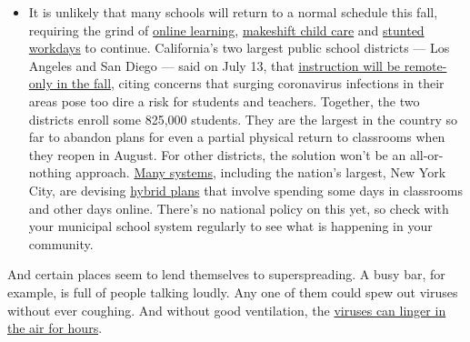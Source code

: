 \begin{itemize}
  \begin{itemize}
  \tightlist
  \item
    It is unlikely that many schools will return to a normal schedule
    this fall, requiring the grind of
    \href{https://www.nytimes3xbfgragh.onion/2020/06/05/us/coronavirus-education-lost-learning.html?action=click\&pgtype=Article\&state=default\&region=MAIN_CONTENT_3\&context=storylines_faq}{online
    learning},
    \href{https://www.nytimes3xbfgragh.onion/2020/05/29/us/coronavirus-child-care-centers.html?action=click\&pgtype=Article\&state=default\&region=MAIN_CONTENT_3\&context=storylines_faq}{makeshift
    child care} and
    \href{https://www.nytimes3xbfgragh.onion/2020/06/03/business/economy/coronavirus-working-women.html?action=click\&pgtype=Article\&state=default\&region=MAIN_CONTENT_3\&context=storylines_faq}{stunted
    workdays} to continue. California's two largest public school
    districts --- Los Angeles and San Diego --- said on July 13, that
    \href{https://www.nytimes3xbfgragh.onion/2020/07/13/us/lausd-san-diego-school-reopening.html?action=click\&pgtype=Article\&state=default\&region=MAIN_CONTENT_3\&context=storylines_faq}{instruction
    will be remote-only in the fall}, citing concerns that surging
    coronavirus infections in their areas pose too dire a risk for
    students and teachers. Together, the two districts enroll some
    825,000 students. They are the largest in the country so far to
    abandon plans for even a partial physical return to classrooms when
    they reopen in August. For other districts, the solution won't be an
    all-or-nothing approach.
    \href{https://bioethics.jhu.edu/research-and-outreach/projects/eschool-initiative/school-policy-tracker/}{Many
    systems}, including the nation's largest, New York City, are
    devising
    \href{https://www.nytimes3xbfgragh.onion/2020/06/26/us/coronavirus-schools-reopen-fall.html?action=click\&pgtype=Article\&state=default\&region=MAIN_CONTENT_3\&context=storylines_faq}{hybrid
    plans} that involve spending some days in classrooms and other days
    online. There's no national policy on this yet, so check with your
    municipal school system regularly to see what is happening in your
    community.
  \end{itemize}
\end{itemize}

And certain places seem to lend themselves to superspreading. A busy
bar, for example, is full of people talking loudly. Any one of them
could spew out viruses without ever coughing. And without good
ventilation, the
\href{https://www.nytimes3xbfgragh.onion/2020/07/04/health/239-experts-with-one-big-claim-the-coronavirus-is-airborne.html}{viruses
can linger in the air for hours}.

